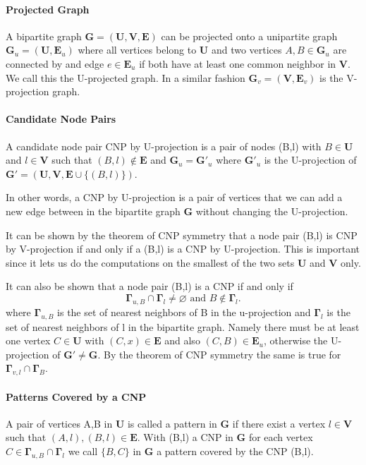 \paragraph{Projected Graph}
A bipartite graph $\textbf{G} = (\textbf{U},\textbf{V},\textbf{E})$ can be projected onto a unipartite graph $\textbf{G}_u = (\textbf{U},\textbf{E}_u)$ where all vertices belong to $\textbf{U}$ and two vertices $A,B\in\textbf{G}_u$ are connected by and edge $e\in\textbf{E}_u$ if both have at least one common neighbor in $\textbf{V}$. We call this the U-projected graph. In a similar fashion $\textbf{G}_v = (\textbf{V},\textbf{E}_v)$ is the V-projection graph.

\paragraph{Candidate Node Pairs}
A candidate node pair CNP by U-projection is a pair of nodes (B,l) with $B\in\textbf{U}$ and $l\in\textbf{V}$ such that $(B,l)\notin\textbf{E}$ and $\textbf{G}_u=\textbf{G}'_u$ where $\textbf{G}'_u$ is the U-projection of $\textbf{G}'=(\textbf{U},\textbf{V},\textbf{E}\cup\{(B,l)\})$.

In other words, a CNP by U-projection is a pair of vertices that we can add a new edge between in the bipartite graph $\textbf{G}$ without changing the U-projection.

It can be shown\cite{plp} by the theorem of CNP symmetry that  a node pair (B,l) is CNP by V-projection if and only if a (B,l) is a CNP by U-projection. This is important since it lets us do the computations on the smallest of the two sets $\textbf{U}$ and $\textbf{V}$ only.

It can also be shown\cite{plp} that a node pair (B,l) is a CNP if and only if 
$$
\mathbf{\Gamma}_{u,B}\cap\bm{\Gamma}_l \neq \varnothing\text{ and } B\notin \mathbf{\Gamma}_l.
$$
where $\bm{\Gamma}_{u,B}$ is the set of nearest neighbors of B in the u-projection and $\bm{\Gamma}_l$ is the set of nearest neighbors of l in the bipartite graph. Namely there must be at least one vertex $C\in\textbf{U}$ with $(C,x)\in\textbf{E}$ and also $(C,B)\in\textbf{E}_u$, otherwise the U-projection of $\textbf{G}'\neq\textbf{G}$. By the theorem of CNP symmetry the same is true for $\bm{\Gamma}_{v,l}\cap\bm{\Gamma}_{B}$.

\paragraph{Patterns Covered by a CNP}
A pair of vertices {A,B} in $\textbf{U}$ is called a pattern in $\textbf{G}$ if there exist a vertex $l\in\textbf{V}$ such that $(A,l),(B,l)\in\textbf{E}$. With (B,l) a CNP in $\textbf{G}$ for each vertex $C\in\bm{\Gamma}_{u,B}\cap\bm{\Gamma}_{l}$ we call $\{B,C\}$ in $\textbf{G}$ a pattern covered by the CNP (B,l).


